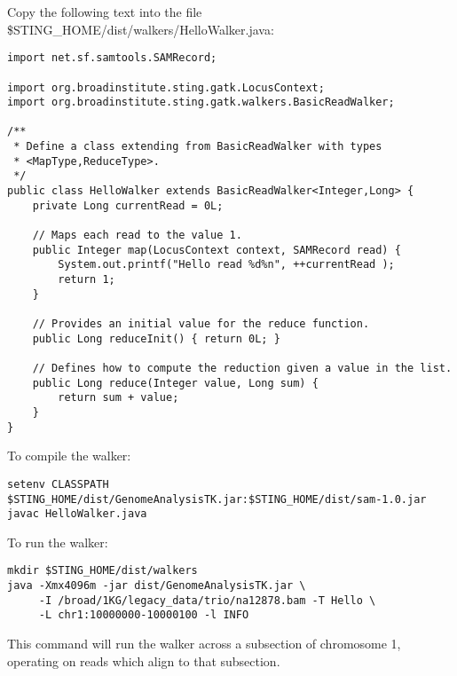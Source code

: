 \documentclass[11pt,fullpage]{article}
\begin{document}
\begin{samepage}
Copy the following text into the file \$STING\_HOME/dist/walkers/HelloWalker.java:

\begin{verbatim}
import net.sf.samtools.SAMRecord;

import org.broadinstitute.sting.gatk.LocusContext;
import org.broadinstitute.sting.gatk.walkers.BasicReadWalker;

/**
 * Define a class extending from BasicReadWalker with types
 * <MapType,ReduceType>.  
 */
public class HelloWalker extends BasicReadWalker<Integer,Long> {
    private Long currentRead = 0L;

    // Maps each read to the value 1.
    public Integer map(LocusContext context, SAMRecord read) {
        System.out.printf("Hello read %d%n", ++currentRead );
        return 1; 
    }

    // Provides an initial value for the reduce function.
    public Long reduceInit() { return 0L; }
    
    // Defines how to compute the reduction given a value in the list. 
    public Long reduce(Integer value, Long sum) { 
        return sum + value;
    }
}
\end{verbatim}
\end{samepage}
To compile the walker:
\begin{verbatim}
setenv CLASSPATH $STING_HOME/dist/GenomeAnalysisTK.jar:$STING_HOME/dist/sam-1.0.jar
javac HelloWalker.java
\end{verbatim}
To run the walker:
\begin{verbatim}
mkdir $STING_HOME/dist/walkers
java -Xmx4096m -jar dist/GenomeAnalysisTK.jar \
     -I /broad/1KG/legacy_data/trio/na12878.bam -T Hello \
     -L chr1:10000000-10000100 -l INFO
\end{verbatim}
This command will run the walker across a subsection of chromosome 1, operating on 
reads which align to that subsection.  
\end{document}
